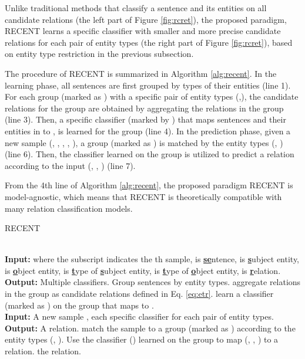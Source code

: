 \documentclass[11pt,a4paper]{article}
\begin{document}
Unlike traditional methods that classify a sentence and its entities on all candidate relations  (the left part of Figure \ref{fig:rcret}),  
the proposed paradigm, RECENT learns a specific classifier with smaller and more precise candidate relations for each pair of entity types (the right part of Figure \ref{fig:rcret}), 
based on entity type restriction in the previous subsection.


The procedure of RECENT is summarized in Algorithm \ref{alg:recent}.
In the learning phase, all sentences are first grouped by types of their entities (line 1). 
For each group (marked as ) with a specific pair of entity types (,), 
the candidate relations   for the group  are obtained by aggregating the relations in the group  (line 3).
Then, a specific classifier (marked by ) that maps sentences and their entities in  to , is learned for the group  (line 4).
In the prediction phase, given a new sample (, , , , ), a group (marked as ) is matched by the entity types (, ) (line 6).
Then, the classifier  learned on the group  is utilized to predict a relation according to the input (, , ) (line 7).


From the 4th line of Algorithm \ref{alg:recent}, the proposed paradigm RECENT is model-agnostic, 
which means that 
RECENT is theoretically compatible with many relation classification models.


\begin{algorithm}[htb]
	\caption{ RECENT}
	\label{alg:recent}
	\begin{algorithmic}[1] \REQUIRE ~~\\ {\bf Input:}   
		where the subscript  indicates the th sample,  is \textbf{\underline{se}}ntence,  is \textbf{\underline{s}}ubject entity, 
		 is \textbf{\underline{o}}bject entity,  is \textbf{\underline{t}}ype of \textbf{\underline{s}}ubject entity,  is  \textbf{\underline{t}}ype of \textbf{\underline{o}}bject entity,  is \textbf{\underline{r}}elation. \\
		{\bf Output:} Multiple classifiers.
		\STATE Group sentences by entity types. 
\STATE aggregate relations in the group as  candidate relations  defined in Eq. \ref{eq:etr}.
		\STATE learn a classifier (marked as ) on the group  that maps  to . \ENDFOR		
		\ENSURE ~~\\ {\bf Input:}  A new sample ,
					each specific classifier for each pair of entity types.	 \\
		{\bf Output:} A relation.
		\STATE match the sample to a group (marked as ) according to the entity types (, ).
		\STATE Use the classifier () learned on the group to map (, , ) to a relation. 
		\RETURN the relation. 
	\end{algorithmic}
\end{algorithm}
\end{document}
